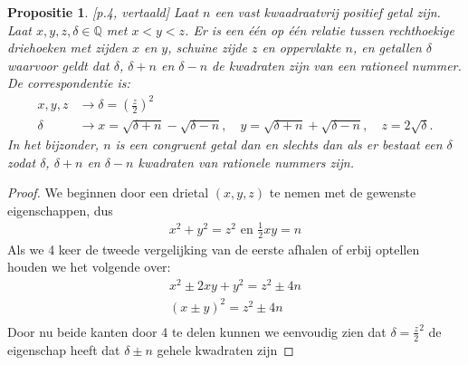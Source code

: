 \documentclass[12pt,reqno]{article}
\newcommand*{\QQ}{\ensuremath{\mathbb{Q}}}
\theoremstyle{theorem}
\newtheorem{proposition}[theorem]{Propositie}
\theoremstyle{definition}
\begin{document}
	\begin{proposition}
		\cite{Koblitz}[p.4, vertaald] Laat $n$ een vast kwaadraatvrij positief getal zijn. Laat $x,y,z,\delta \in\QQ$ met $x<y<z$. Er is een \'e\'en op \'e\'en relatie tussen rechthoekige driehoeken met zijden $x$ en $y$, schuine zijde $z$ en oppervlakte $n$, en getallen $\delta$ waarvoor geldt dat $\delta$, $\delta +n$ en $\delta -n$ de kwadraten zijn van een rationeel nummer. De correspondentie is:
		\begin{align}
		x,y,z &\rightarrow \delta = \left( \frac{z}{2} \right)^2 \\
		\delta &\rightarrow x=\sqrt{\delta+n} - \sqrt{\delta-n},\quad y = \sqrt{\delta+n}+\sqrt{\delta-n},\quad z = 2\sqrt{\delta}.
		\end{align}
		In het bijzonder, $n$ is een congruent getal dan en slechts dan als er bestaat een $\delta$ zodat $\delta$, $\delta+n$ en $\delta-n$ kwadraten van rationele nummers zijn.
	\end{proposition}
	\begin{proof}
	We beginnen door een drietal $(x,y,z)$ te nemen met de gewenste eigenschappen, dus
	\begin{align*}
	x^2 + y^2 = z^2 \text{ en } \frac{1}{2}xy=n
	\end{align*}
	Als we 4 keer de tweede vergelijking van de eerste afhalen of erbij optellen houden we het volgende over:
	\begin{align*}
	x^2 \pm 2xy + y^2 = z^2 \pm 4n\\
	(x \pm y)^2 = z^2 \pm 4n\\
	\end{align*}
	Door nu beide kanten door 4 te delen kunnen we eenvoudig zien dat $\delta = \frac{z}{2}^2$ de eigenschap heeft dat $\delta \pm n$ gehele kwadraten zijn
	\end{proof}
	
\end{document}
